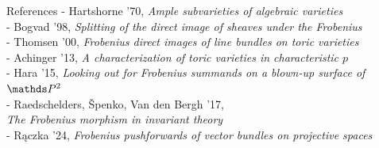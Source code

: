 \documentclass[beamer]{paper}
\begin{document}






\begin{frame}[t]{References}
  \scriptsize{
    - Hartshorne '70, \hfill\textit{Ample subvarieties of algebraic varieties} \\[1.5em]
    - Bogvad '98, \hfill\textit{Splitting of the direct image of sheaves under the Frobenius} \\[1.5em]
    - Thomsen '00, \hfill\textit{Frobenius direct images of line bundles on toric varieties} \\[1.5em]
    - Achinger '13, \hfill\textit{A characterization of toric varieties in characteristic $p$} \\[1.5em]
    - Hara '15, \hfill\textit{Looking out for Frobenius summands on a blown-up surface of $\PP2$} \\[1.5em]
    - Raedschelders, Špenko, Van den Bergh '17, \\ \hfill\textit{The Frobenius morphism in invariant theory} \\[0.5em]
    - Rączka '24, \hfill\textit{Frobenius pushforwards of vector bundles on projective spaces}
  }

  \renewcommand{\section}{\subsection}
  \printbibliography
\end{frame}
\end{document}
